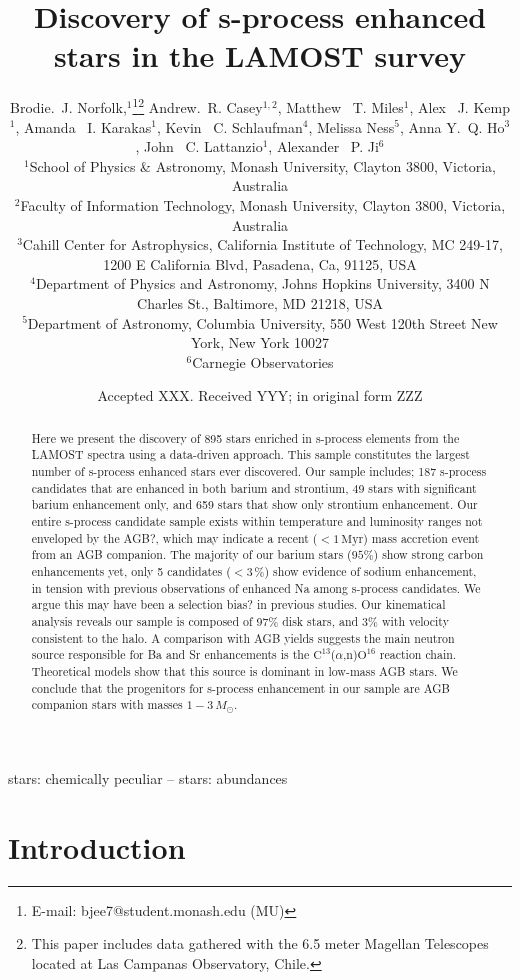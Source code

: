 \documentclass[a4paper,fleqn,usenatbib]{mnras}
\title[S-process stars in LAMOST]{Discovery of s-process enhanced stars in the LAMOST survey}
\author[Brodie.~J. Norfolk et al.]{Brodie.~J. Norfolk,$^{1}$\thanks{E-mail: bjee7@student.monash.edu (MU)}\thanks{This paper includes data gathered with the 6.5 meter Magellan Telescopes located at Las Campanas Observatory, Chile.}
Andrew.~R. Casey$^{1,2}$,
Matthew ~T. Miles$^{1}$,
Alex ~J. Kemp$^{1}$, \newauthor
Amanda ~I. Karakas$^{1}$,
Kevin ~C. Schlaufman$^{4}$,
Melissa Ness$^{5}$,
Anna Y.~Q. Ho$^{3}$, \newauthor
John ~C. Lattanzio$^{1}$, 
Alexander ~P. Ji$^{6}$
\\
$^{1}$School of Physics \& Astronomy, Monash University, Clayton 3800, Victoria, Australia\\
$^{2}$Faculty of Information Technology, Monash University, Clayton 3800, Victoria, Australia\\
$^{3}$Cahill Center for Astrophysics, California Institute of Technology, MC 249-17, 1200 E California Blvd, Pasadena, Ca, 91125, USA\\
$^{4}$Department of Physics and Astronomy, Johns Hopkins University, 3400 N Charles St., Baltimore, MD 21218, USA
\\
$^{5}$Department of Astronomy, Columbia University, 550 West 120th Street New York, New York 10027
\\
$^{6}$Carnegie Observatories
}
\date{Accepted XXX. Received YYY; in original form ZZZ}
\begin{document}
\label{firstpage}
\pagerange{\pageref{firstpage}--\pageref{lastpage}}
\maketitle

\begin{abstract}

Here we present the discovery of 895 stars enriched in s-process elements from the LAMOST spectra using a data-driven approach. This sample constitutes the largest number of s-process enhanced stars ever discovered. Our sample includes; 187 s-process candidates that are enhanced in both barium and strontium, 49 stars with significant barium enhancement only, and 659 stars that show only strontium enhancement. Our entire s-process candidate sample exists within temperature and luminosity ranges not enveloped by the AGB?, which may indicate a recent ($<1\,\textrm{Myr}$) mass accretion event from an AGB companion. The majority of our barium stars ($95\%$) show strong carbon enhancements yet, only 5 candidates ($<3$\,\%) show evidence of sodium enhancement, in tension with previous observations of enhanced Na among s-process candidates. We argue this may have been a selection bias? in previous studies. Our kinematical analysis reveals our sample is composed of 97\% disk stars, and 3\% with velocity consistent to the halo. A comparison with AGB yields suggests the main neutron source responsible for Ba and Sr enhancements is the $\text{C}^{13}$(\textrm{$\alpha$},n)$\text{O}^{16}$ reaction chain. Theoretical models show that this source is dominant in low-mass AGB stars. We conclude that the progenitors for s-process enhancement in our sample are AGB companion stars with masses $1 - 3\,M_{\odot}$. 

\end{abstract}

\begin{keywords}
stars: chemically peculiar -- stars: abundances
\end{keywords}

\section{Introduction} \label{sec:intro}
\end{document}
